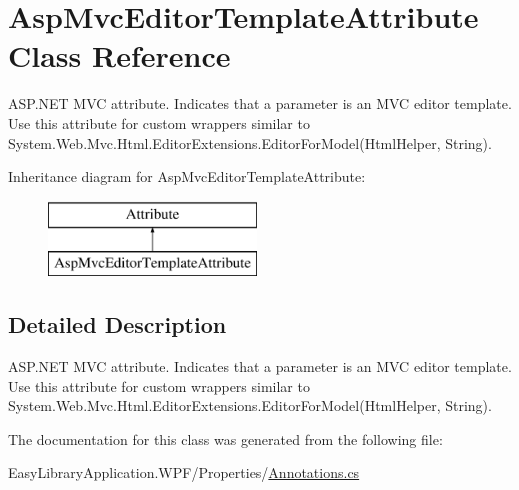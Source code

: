 \hypertarget{class_asp_mvc_editor_template_attribute}{}\section{Asp\+Mvc\+Editor\+Template\+Attribute Class Reference}
\label{class_asp_mvc_editor_template_attribute}


A\+S\+P.\+N\+ET M\+VC attribute. Indicates that a parameter is an M\+VC editor template. Use this attribute for custom wrappers similar to {\ttfamily System.\+Web.\+Mvc.\+Html.\+Editor\+Extensions.\+Editor\+For\+Model(\+Html\+Helper, String)}.  


Inheritance diagram for Asp\+Mvc\+Editor\+Template\+Attribute\+:\begin{figure}[H]
\begin{center}
\leavevmode
\includegraphics[height=2.000000cm]{class_asp_mvc_editor_template_attribute}
\end{center}
\end{figure}


\subsection{Detailed Description}
A\+S\+P.\+N\+ET M\+VC attribute. Indicates that a parameter is an M\+VC editor template. Use this attribute for custom wrappers similar to {\ttfamily System.\+Web.\+Mvc.\+Html.\+Editor\+Extensions.\+Editor\+For\+Model(\+Html\+Helper, String)}. 



The documentation for this class was generated from the following file\+:\begin{DoxyCompactItemize}
\item 
Easy\+Library\+Application.\+W\+P\+F/\+Properties/\mbox{\hyperlink{_annotations_8cs}{Annotations.\+cs}}\end{DoxyCompactItemize}
